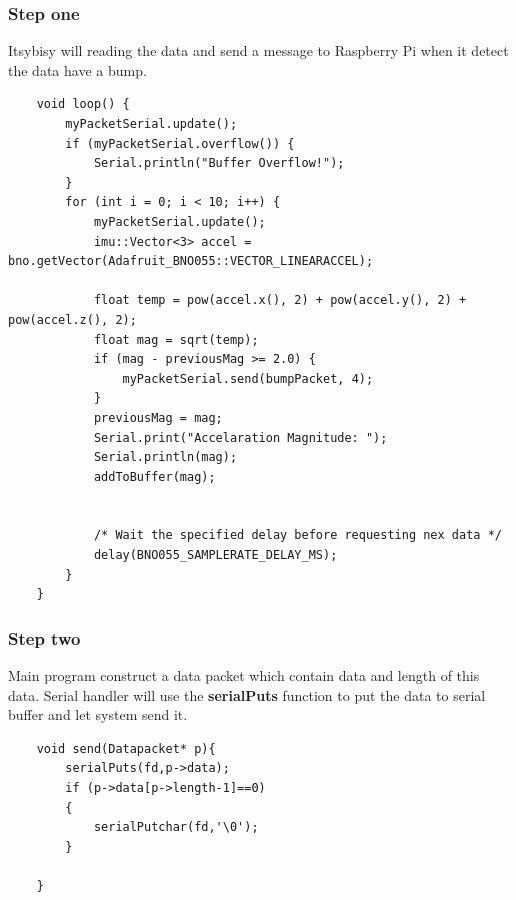 \documentclass{article}
\begin{document}
	\subsubsection{Step one}
	Itsybisy will reading the data and send a message to Raspberry Pi when it detect the data have a bump.
	\begin{lstlisting}
	void loop() {
		myPacketSerial.update();
		if (myPacketSerial.overflow()) {
			Serial.println("Buffer Overflow!");
		}
		for (int i = 0; i < 10; i++) {
			myPacketSerial.update();
			imu::Vector<3> accel = bno.getVector(Adafruit_BNO055::VECTOR_LINEARACCEL);
			
			float temp = pow(accel.x(), 2) + pow(accel.y(), 2) + pow(accel.z(), 2);
			float mag = sqrt(temp);
			if (mag - previousMag >= 2.0) {
				myPacketSerial.send(bumpPacket, 4);
			}
			previousMag = mag;
			Serial.print("Accelaration Magnitude: ");
			Serial.println(mag);
			addToBuffer(mag);
			
			
			/* Wait the specified delay before requesting nex data */
			delay(BNO055_SAMPLERATE_DELAY_MS);
		}
	}
	\end{lstlisting}
	\subsubsection{Step two}
	Main program construct a data packet which contain data and length of this data. Serial handler will use the \textbf{serialPuts} function to put the data to serial buffer and let system send it.
	\begin{lstlisting}
	void send(Datapacket* p){
		serialPuts(fd,p->data);
		if (p->data[p->length-1]==0)
		{
			serialPutchar(fd,'\0');
		}
	
	}
	\end{lstlisting}
\end{document}
